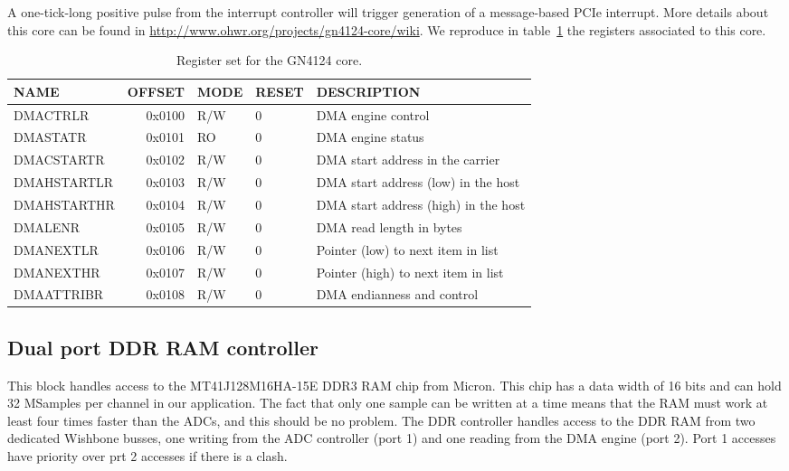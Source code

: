 \documentclass{article}
\begin{document}
A one-tick-long positive pulse from the interrupt controller will trigger generation of a message-based PCIe interrupt. More details about this core can be found in \href{http://www.ohwr.org/projects/gn4124-core/wiki}{http://www.ohwr.org/projects/gn4124-core/wiki}. We reproduce in table~\ref{tab:gn4124_core} the registers associated to this core. 

\begin{table}[htbp]
  \centering
  \begin{tabularx}{\textwidth}{|l|r|l|l|X|}
    \hline
    \textbf{NAME} & \textbf{OFFSET} & \textbf{MODE} & \textbf{RESET} & \textbf{DESCRIPTION} \\
    \hline
    \hline
    DMACTRLR & 0x0100 & R/W & 0 & DMA engine control\\
    \hline
    DMASTATR & 0x0101 & RO & 0 & DMA engine status\\
    \hline
    DMACSTARTR & 0x0102 & R/W & 0 & DMA start address in the carrier\\
    \hline
    DMAHSTARTLR & 0x0103 & R/W & 0 & DMA start address (low) in the host\\
    \hline
    DMAHSTARTHR & 0x0104 & R/W & 0 & DMA start address (high) in the host\\
    \hline
    DMALENR & 0x0105 & R/W & 0 & DMA read length in bytes\\
    \hline
    DMANEXTLR & 0x0106 & R/W & 0 & Pointer (low) to next item in list\\
    \hline
    DMANEXTHR & 0x0107 & R/W & 0 & Pointer (high) to next item in list\\
    \hline
    DMAATTRIBR & 0x0108 & R/W & 0 & DMA endianness and control\\
    \hline
  \end{tabularx}
  \caption{Register set for the GN4124 core.}
  \label{tab:gn4124_core}
\end{table}

\subsection{Dual port DDR RAM controller}
This block handles access to the MT41J128M16HA-15E DDR3 RAM chip from Micron. This chip has a data width of 16 bits and can hold 32 MSamples per channel in our application. The fact that only one sample can be written at a time means that the RAM must work at least four times faster than the ADCs, and this should be no problem. The DDR controller handles access to the DDR RAM from two dedicated Wishbone busses, one writing from the ADC controller (port 1) and one reading from the DMA engine (port 2). Port 1 accesses have priority over prt 2 accesses if there is a clash.
\end{document}
